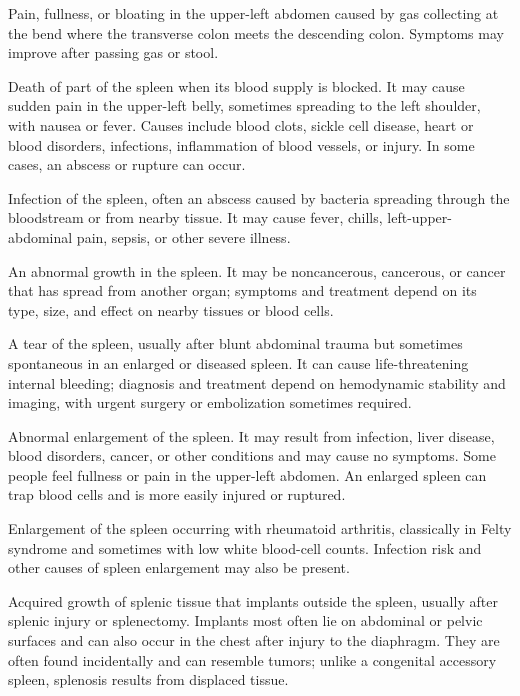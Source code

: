  Pain, fullness, or bloating in the upper-left abdomen caused by gas collecting at the bend where the transverse colon meets the descending colon. Symptoms may improve after passing gas or stool.

 Death of part of the spleen when its blood supply is blocked. It may cause sudden pain in the upper-left belly, sometimes spreading to the left shoulder, with nausea or fever. Causes include blood clots, sickle cell disease, heart or blood disorders, infections, inflammation of blood vessels, or injury. In some cases, an abscess or rupture can occur.

 Infection of the spleen, often an abscess caused by bacteria spreading through the bloodstream or from nearby tissue. It may cause fever, chills, left-upper-abdominal pain, sepsis, or other severe illness.

 An abnormal growth in the spleen. It may be noncancerous, cancerous, or cancer that has spread from another organ; symptoms and treatment depend on its type, size, and effect on nearby tissues or blood cells.

 A tear of the spleen, usually after blunt abdominal trauma but sometimes spontaneous in an enlarged or diseased spleen. It can cause life-threatening internal bleeding; diagnosis and treatment depend on hemodynamic stability and imaging, with urgent surgery or embolization sometimes required.

 Abnormal enlargement of the spleen. It may result from infection, liver disease, blood disorders, cancer, or other conditions and may cause no symptoms. Some people feel fullness or pain in the upper-left abdomen. An enlarged spleen can trap blood cells and is more easily injured or ruptured.

 Enlargement of the spleen occurring with rheumatoid arthritis, classically in Felty syndrome and sometimes with low white blood-cell counts. Infection risk and other causes of spleen enlargement may also be present.

 Acquired growth of splenic tissue that implants outside the spleen, usually after splenic injury or splenectomy. Implants most often lie on abdominal or pelvic surfaces and can also occur in the chest after injury to the diaphragm. They are often found incidentally and can resemble tumors; unlike a congenital accessory spleen, splenosis results from displaced tissue.

